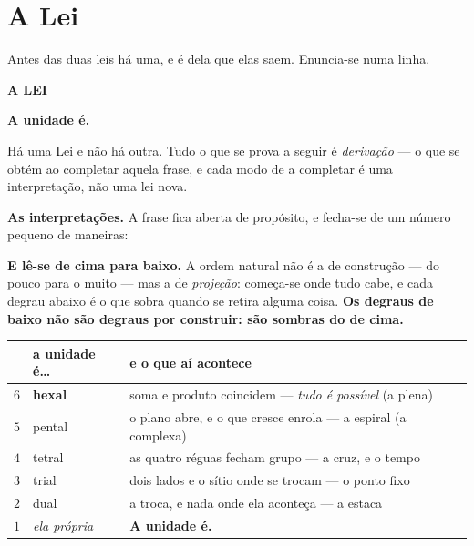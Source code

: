 \documentclass[livro.tex]{subfiles}
\begin{document}
\section{A Lei}\label{sec:leizero}

\noindent Antes das duas leis há uma, e é dela que elas saem. Enuncia-se numa linha.

\begin{mdframed}[linewidth=0.6pt,innerleftmargin=12pt,innerrightmargin=12pt,
                 innertopmargin=10pt,innerbottommargin=10pt,skipabove=8pt,skipbelow=8pt]
\begin{center}
\textbf{\large A LEI}
\medskip

\textbf{\Large A unidade é.}
\end{center}
\end{mdframed}

\noindent Há uma Lei e não há outra. Tudo o que se prova a seguir é \emph{derivação} ---
o que se obtém ao completar aquela frase, e cada modo de a completar é uma interpretação, não uma
lei nova.

\medskip
\noindent \textbf{As interpretações.} A frase fica aberta de propósito, e fecha-se de um número
pequeno de maneiras:

\noindent \textbf{E lê-se de cima para baixo.} A ordem natural não é a de construção --- do
pouco para o muito --- mas a de \emph{projeção}: começa-se onde tudo cabe, e cada degrau abaixo é
o que sobra quando se retira alguma coisa. \textbf{Os degraus de baixo não são degraus por
construir: são sombras do de cima.}

\begin{center}\small
\begin{tabular}{@{}cll@{}}
\toprule
& \textbf{a unidade é\dots} & \textbf{e o que aí acontece} \\
\midrule
$6$ & \textbf{hexal}    & soma e produto coincidem --- \emph{tudo é possível} (a plena) \\
$5$ & pental & o plano abre, e o que cresce enrola --- a espiral (a complexa) \\
$4$ & tetral   & as quatro réguas fecham grupo --- a cruz, e o tempo \\
$3$ & trial    & dois lados e o sítio onde se trocam --- o ponto fixo \\
$2$ & dual     & a troca, e nada onde ela aconteça --- a estaca \\
$1$ & \emph{ela própria} & \textbf{A unidade é.} \\
\bottomrule
\end{tabular}
\end{center}
\end{document}
